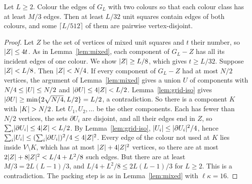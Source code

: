 \begin{lemma}\label{lem:grid-mixed}
Let $L\ge2$. Colour the edges of $G_L$ with two colours so that each colour class has at least $M/3$ edges. Then at least $L/32$ unit squares contain edges of both colours, and some $\lceil L/512\rceil$ of them are pairwise vertex-disjoint.
\end{lemma}

\begin{proof}
Let $Z$ be the set of vertices of mixed unit squares and $t$ their number, so $\lvert Z\rvert\le4t$. As in Lemma~\ref{lem:mixed}, each component of $G_L-Z$ has all its incident edges of one colour. We show $\lvert Z\rvert\ge L/8$, which gives $t\ge L/32$. Suppose $\lvert Z\rvert<L/8$. Then $\lvert Z\rvert<N/4$. If every component of $G_L-Z$ had at most $N/2$ vertices, the argument of Lemma~\ref{lem:mixed} gives a union $U$ of components with $N/4\le\lvert U\rvert\le N/2$ and $\lvert \partial U\rvert\le4\lvert Z\rvert<L/2$. Lemma~\ref{lem:grid-iso} gives $\lvert \partial U\rvert\ge\min\{2\sqrt{N/4},L/2\}=L/2$, a contradiction. So there is a component $K$ with $\lvert K\rvert>N/2$. Let $U_1,U_2,\dots$ be the other components. Each has fewer than $N/2$ vertices, the sets $\partial U_i$ are disjoint, and all their edges end in $Z$, so $\sum_i\lvert \partial U_i\rvert\le4\lvert Z\rvert<L/2$. By Lemma~\ref{lem:grid-iso}, $\lvert U_i\rvert\le\lvert \partial U_i\rvert^2/4$, hence $\sum_i\lvert U_i\rvert\le(\sum_i\lvert \partial U_i\rvert)^2/4\le4\lvert Z\rvert^2$. Every edge of the colour not used at $K$ lies inside $V\setminus K$, which has at most $\lvert Z\rvert+4\lvert Z\rvert^2$ vertices, so there are at most $2\lvert Z\rvert+8\lvert Z\rvert^2<L/4+L^2/8$ such edges. But there are at least $M/3=2L(L-1)/3$, and $L/4+L^2/8\le2L(L-1)/3$ for $L\ge2$. This is a contradiction. The packing step is as in Lemma~\ref{lem:mixed} with $\ell\kappa=16$.
\end{proof}
